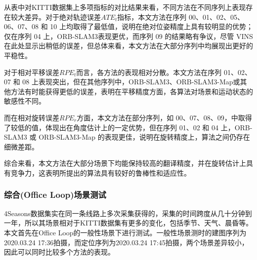 从表中对KITTI数据集上多项指标的对比结果来看，不同方法在不同序列上表现存在较大差异。对于绝对轨迹误差$ATE_t$指标，本文方法在序列 00、01、02、05、06、07、08 和 10 上均取得了最低值，说明在绝对位姿精度上具有较明显的优势；仅在序列 04 上，ORB-SLAM3表现更优，而序列 09 的结果略有争议，尽管 VINS 在此处显示出稍低的误差，但总体来看，本文方法在大部分序列中均展现出更好的平稳性。

对于相对平移误差$RPE_t$而言，各方法的表现相对分散。本文方法在序列 01、02、07 和 08 上表现突出，但在其他序列中，ORB-SLAM3、ORB-SLAM3-Map或其他方法有时能获得更低的误差，表明在平移精度方面，各算法对场景和运动状态的敏感性不同。

而在相对旋转误差$RPE_r$方面，本文方法在部分序列，如 00、07、08、09，中取得了较低的值，体现出在角度估计上的一定优势，但在序列 01、02 和 04 上，ORB-SLAM3 或 ORB-SLAM3-Map 的表现更佳，说明在旋转精度上，算法之间仍存在细微差距。

综合来看，本文方法在大部分场景下均能保持较高的翻译精度，并在旋转估计上具有竞争力，这表明所提出的算法具有较好的鲁棒性和适应性。


\subsubsection{综合(Office Loop)场景测试}
4Seasons数据集实在同一条线路上多次采集获得的，采集的时间跨度从几十分钟到一年，所以其场景相对于KITTI数据集有更多的变化，包括季节、天气、晨昏等。本文首先在Office Loop的一般性场景下进行测试。一般性场景测时的建图序列为2020.03.24 17:36拍摄，而定位序列为2020.03.24 17:45拍摄，两个场景差异较小，因此可以同时比较多个方法的表现。

